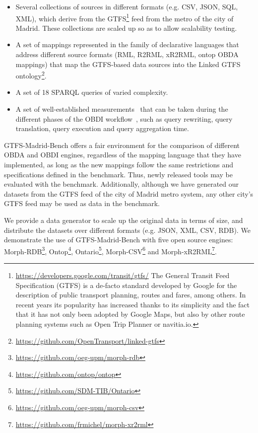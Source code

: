 \begin{itemize}
    \item Several collections of sources in different formats (e.g. CSV, JSON, SQL, XML), which derive from the GTFS\footnote{\url{https://developers.google.com/transit/gtfs/} The General Transit Feed Specification (GTFS) is a de-facto standard developed by Google for the description of public transport planning, routes and fares, among others. In recent years its popularity has increased thanks to its simplicity and the fact that it has not only been adopted by Google Maps, but also by other route planning systems such as Open Trip Planner or navitia.io.} feed from the metro of the city of Madrid. These collections are scaled up so as to allow scalability testing.
    \item A set of mappings represented in the family of declarative languages that address different source formats (RML, R2RML, xR2RML, ontop OBDA mappings) that map the GTFS-based data sources into the Linked GTFS ontology\footnote{\url{https://github.com/OpenTransport/linked-gtfs}}.
    \item A set of 18 SPARQL queries of varied complexity.
    \item A set of well-established measurements~\citep{mora2013towards,lanti2015npd} that can be taken during the different phases of the OBDI workflow~\citep{lanti2015npd,acosta2011anapsid}, such as query rewriting, query translation, query execution and query aggregation time.
\end{itemize}
GTFS-Madrid-Bench offers a fair environment for the comparison of different OBDA and OBDI engines, regardless of the mapping language that they have implemented, as long as the new mappings follow the same restrictions and specifications defined in the benchmark. Thus, newly released tools may be evaluated with the benchmark. Additionally, although we have generated our datasets from the GTFS feed of the city of Madrid metro system, any other city's GTFS feed may be used as data in the benchmark. 

We provide a data generator to scale up the original data in terms of size, and distribute the datasets over different formats (e.g. JSON, XML, CSV, RDB). We demonstrate the use of GTFS-Madrid-Bench with five open source engines: Morph-RDB\footnote{\url{https://github.com/oeg-upm/morph-rdb}}, Ontop\footnote{\url{https://github.com/ontop/ontop}}, Ontario\footnote{\url{https://github.com/SDM-TIB/Ontario}}, Morph-CSV\footnote{\url{https://github.com/oeg-upm/morph-csv}} and Morph-xR2RML\footnote{\url{https://github.com/frmichel/morph-xr2rml}}. 

